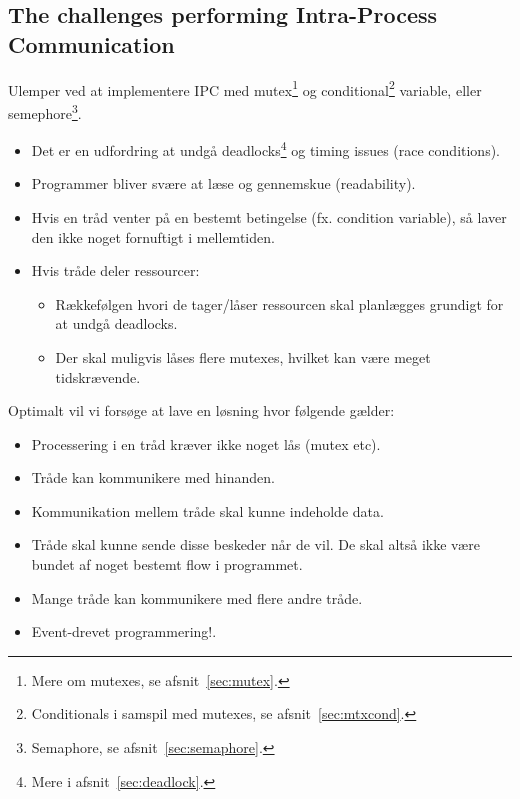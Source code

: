 \subsection{The challenges performing Intra-Process Communication}\label{sec:ipc}
Ulemper ved at implementere IPC med mutex\footnote{Mere om mutexes, se afsnit~\ref{sec:mutex}.} og conditional\footnote{Conditionals i samspil med mutexes, se afsnit~\ref{sec:mtxcond}.} variable, eller semephore\footnote{Semaphore, se afsnit~\ref{sec:semaphore}.}.

\begin{itemize}
	\item Det er en udfordring at undgå deadlocks\footnote{Mere i afsnit~\ref{sec:deadlock}.} og timing issues (race conditions).
	\item Programmer bliver svære at læse og gennemskue (readability).
	\item Hvis en tråd venter på en bestemt betingelse (fx. condition variable), så laver den ikke noget fornuftigt i mellemtiden.
	\item Hvis tråde deler ressourcer:
	\begin{itemize}
		\item Rækkefølgen hvori de tager/låser ressourcen skal planlægges grundigt for at undgå deadlocks.
		\item Der skal muligvis låses flere mutexes, hvilket kan være meget tidskrævende.
	\end{itemize}
\end{itemize}

Optimalt vil vi forsøge at lave en løsning hvor følgende gælder:

\begin{itemize}
	\item Processering i en tråd kræver ikke noget lås (mutex etc). 
	\item Tråde kan kommunikere med hinanden.
	\item Kommunikation mellem tråde skal kunne indeholde data.
	\item Tråde skal kunne sende disse beskeder når de vil. De skal altså ikke være bundet af noget bestemt flow i programmet.
	\item Mange tråde kan kommunikere med flere andre tråde.\\
	\item Event-drevet programmering!. 
\end{itemize}

